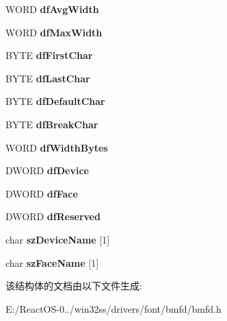 \begin{DoxyCompactItemize}
W\+O\+RD {\bfseries df\+Avg\+Width}
\item 
\mbox{\label{struct___f_o_n_t_d_i_r_e_n_t_r_y_abd07de5be2f177a362a8285db570ff51}} 
W\+O\+RD {\bfseries df\+Max\+Width}
\item 
\mbox{\label{struct___f_o_n_t_d_i_r_e_n_t_r_y_ab243216e25c621e223765d77f77600bf}} 
B\+Y\+TE {\bfseries df\+First\+Char}
\item 
\mbox{\label{struct___f_o_n_t_d_i_r_e_n_t_r_y_a23c09d6b35c71c919dade741198958f1}} 
B\+Y\+TE {\bfseries df\+Last\+Char}
\item 
\mbox{\label{struct___f_o_n_t_d_i_r_e_n_t_r_y_a91b62a34fea93df942b9ec0997008cce}} 
B\+Y\+TE {\bfseries df\+Default\+Char}
\item 
\mbox{\label{struct___f_o_n_t_d_i_r_e_n_t_r_y_ad54fcaa95b0b7c1efe9225075bb565a6}} 
B\+Y\+TE {\bfseries df\+Break\+Char}
\item 
\mbox{\label{struct___f_o_n_t_d_i_r_e_n_t_r_y_abbae6774b5ae05c99c693a6511234620}} 
W\+O\+RD {\bfseries df\+Width\+Bytes}
\item 
\mbox{\label{struct___f_o_n_t_d_i_r_e_n_t_r_y_a7dc545bdd0d816293f5f8a9b9568093c}} 
D\+W\+O\+RD {\bfseries df\+Device}
\item 
\mbox{\label{struct___f_o_n_t_d_i_r_e_n_t_r_y_a2289278327ccabc9574021af9036d25c}} 
D\+W\+O\+RD {\bfseries df\+Face}
\item 
\mbox{\label{struct___f_o_n_t_d_i_r_e_n_t_r_y_aab2c99c3c7feff54f24d6a6a8cb032cf}} 
D\+W\+O\+RD {\bfseries df\+Reserved}
\item 
\mbox{\label{struct___f_o_n_t_d_i_r_e_n_t_r_y_a676cdc327d429c45cdc00b13cbe1eaea}} 
char {\bfseries sz\+Device\+Name} \mbox{[}1\mbox{]}
\item 
\mbox{\label{struct___f_o_n_t_d_i_r_e_n_t_r_y_a74e10c59bbf43d1e72068f3fb4ddd571}} 
char {\bfseries sz\+Face\+Name} \mbox{[}1\mbox{]}
\end{DoxyCompactItemize}


该结构体的文档由以下文件生成\+:\begin{DoxyCompactItemize}
\item 
E\+:/\+React\+O\+S-\/0../win32ss/drivers/font/bmfd/bmfd.\+h\end{DoxyCompactItemize}
